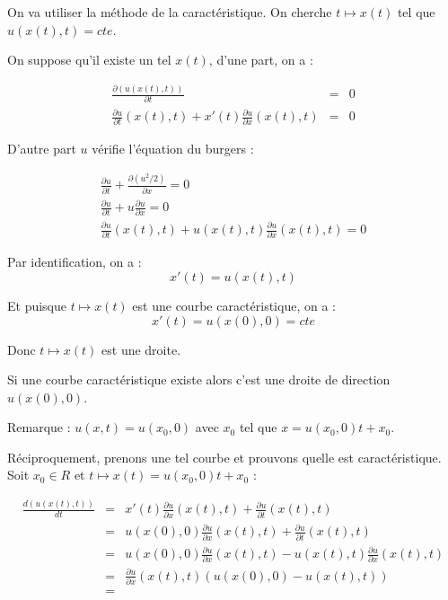 \documentclass{article}
\begin{document}
On va utiliser la méthode de la caractéristique. On cherche $t \longmapsto x(t)$ tel que $u(x(t),t) = cte$.

On suppose qu'il existe un tel $x(t)$, d'une part, on a :

\begin{eqnarray*}
	\frac{\partial (u(x(t),t))}{\partial t} &=& 0 \\
	\frac{\partial u}{\partial t}(x(t),t) + x'(t) \frac{\partial u}{\partial x}(x(t),t) &=& 0
\end{eqnarray*}

D'autre part $u$ vérifie l'équation du burgers :

\begin{eqnarray*}
	\frac{\partial u}{\partial t} + \frac{\partial (u^2/2)}{\partial x} = 0 \\
	\frac{\partial u}{\partial t} + u \frac{\partial u}{\partial x} = 0 \\
	\frac{\partial u}{\partial t}(x(t),t) + u(x(t),t) \frac{\partial u}{\partial x}(x(t),t) = 0 
\end{eqnarray*}

Par identification, on a :
\[ x'(t) = u(x(t),t) \]

Et puisque $t \longmapsto x(t)$ est une courbe caractéristique, on a :
\[x'(t) = u(x(0),0) = cte\]

Donc $t \longmapsto x(t)$ est une droite.

Si une courbe caractéristique existe alors c'est une droite de direction $u(x(0),0)$.
\newline

Remarque : $u(x,t) = u(x_0,0)$ avec $x_0$ tel que $x = u(x_0,0) t + x_0$.
\newline

Réciproquement, prenons une tel courbe et prouvons quelle est caractéristique. Soit $x_0 \in R$ et $t \longmapsto x(t) = u(x_0,0) t + x_0$ :

\begin{eqnarray*}
	\frac{d (u(x(t),t))}{dt} &=& x'(t) \frac{\partial u}{\partial x}(x(t),t) + \frac{\partial u}{\partial t}(x(t),t) \\
	&=& u(x(0),0) \frac{\partial u}{\partial x}(x(t),t) + \frac{\partial u}{\partial t}(x(t),t) \\
	&=& u(x(0),0) \frac{\partial u}{\partial x}(x(t),t) - u(x(t),t) \frac{\partial u}{\partial x}(x(t),t) \\
	&=& \frac{\partial u}{\partial x}(x(t),t) \left( u(x(0),0)-u(x(t),t) \right) \\
	&=& 
\end{eqnarray*}
\end{document}
